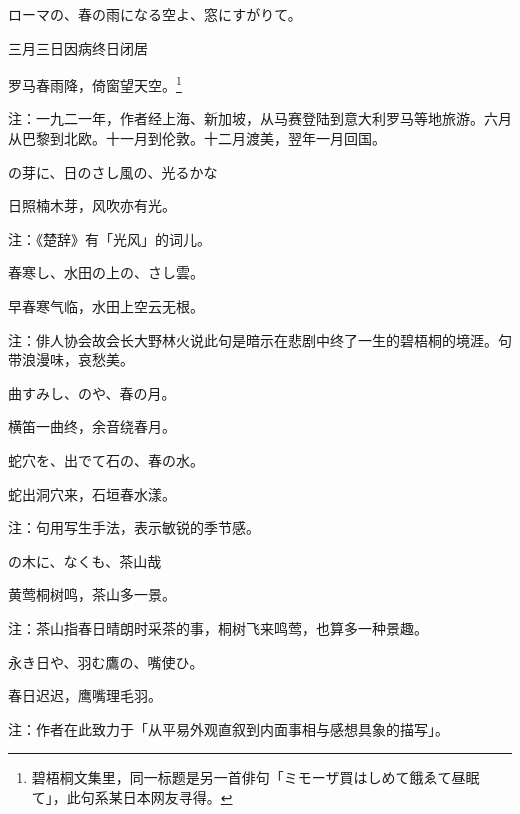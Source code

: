 \setcounter{haikucounter}{0}

\begin{haiku}
    {\FH ローマの、春の雨になる空よ、窓にすがりて。}

    {\FK 三月三日因病终日闭居}

    {\FK 罗马春雨降，倚窗望天空。\footnote{\FT 碧梧桐文集里，同一标题是另一首俳句「{\FM ミモーザ買はしめて餓ゑて昼眠て}」，此句系某日本网友寻得。}}

    {\FT 注：一九二一年，作者经上海、新加坡，从马赛登陆到意大利罗马等地旅游。六月从巴黎到北欧。十一月到伦敦。十二月渡美，翌年一月回国。}
\end{haiku}

\begin{haiku}
    {\FH {}の芽に、日のさし風の、光るかな}

    {\FK 日照楠木芽，风吹亦有光。}

    {\FT 注：《楚辞》有「光风」的词儿。}
\end{haiku}

\begin{haiku}
    {\FH 春寒し、水田の上の、さし雲。}

    {\FK 早春寒气临，水田上空云无根。}

    {\FT 注：俳人协会故会长大野林火说此句是暗示在悲剧中终了一生的碧梧桐的境涯。句带浪漫味，哀愁美。}
\end{haiku}

\begin{haiku}
    {\FH 曲すみし、のや、春の月。}

    {\FK 横笛一曲终，余音绕春月。}
\end{haiku}

\begin{haiku}
    {\FH 蛇穴を、出でて石の、春の水。}

    {\FK 蛇出洞穴来，石垣春水漾。}

    {\FT 注：句用写生手法，表示敏锐的季节感。}
\end{haiku}

\begin{haiku}
    {\FH {}の木に、なくも、茶山哉}

    {\FK 黄莺桐树鸣，茶山多一景。}

    {\FT 注：茶山指春日晴朗时采茶的事，桐树飞来鸣莺，也算多一种景趣。}
\end{haiku}

\begin{haiku}
    {\FH 永き日や、羽む鷹の、嘴使ひ。}

    {\FK 春日迟迟，鹰嘴理毛羽。}

    {\FT 注：作者在此致力于「从平易外观直叙到内面事相与感想具象的描写」。}
\end{haiku}

